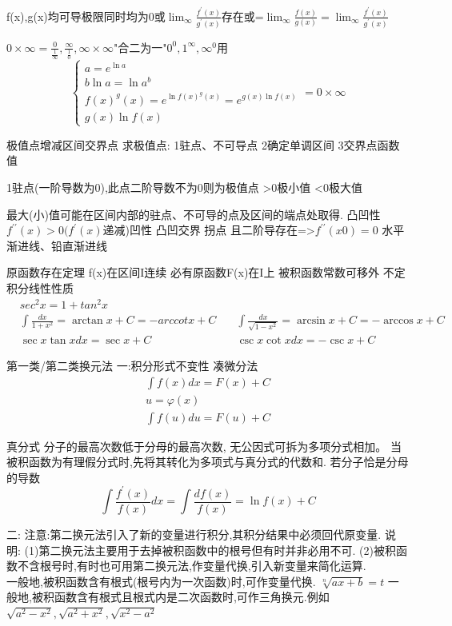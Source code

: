 \documentclass[10pt, a4paper, oneside]{ctexart}
\begin{document}
\begin{sloppypar}
	f(x),g(x)均可导极限同时均为0或$\lim_{\infty}\frac{f^{\prime}(x)}{g^{\prime}(x)}$存在或=$\lim_{\infty}\frac{f(x)}{g(x)} = \lim_{\infty}\frac{f^{\prime}(x)}{g^{\prime}(x)}$\par
	$0 \times \infty = \frac{0}{ \frac{1}{\infty}} , \frac{\infty}{\frac{1}{0}},
		\infty \times \infty $"合二为一"$0^0,1^\infty,\infty^0$用
	$$
		\begin{cases}
			a=e^{\ln a}                                        \\
			b\ln a = \ln{a^b}                                  \\
			f(x)^g(x) = e^{\ln{f(x)^g(x)}} = e^{g(x)\ln{f(x)}} \\
			g(x)\ln{f(x)}
		\end{cases}=0\times\infty
	$$

	极值点增减区间交界点
	求极值点:
	1驻点、不可导点
	2确定单调区间
	3交界点函数值

	1驻点(一阶导数为0),此点二阶导数不为0则为极值点 >0极小值 <0极大值

	最大(小)值可能在区间内部的驻点、不可导的点及区间的端点处取得.
	凸凹性$f^{\prime\prime}(x)>0(f^{\prime}(x)$递减)凹性 凸凹交界 拐点 且二阶导存在=>$f^{\prime\prime}(x0) = 0$
	水平渐进线、铅直渐进线

	原函数存在定理 f(x)在区间I连续 必有原函数F(x)在I上
	被积函数常数可移外
	不定积分线性性质
	\begin{align*}
		 & sec^2 x = 1 + tan^2 x                                  &                                                            \\
		 & \int\frac{dx}{1+x^2}=\arctan x + C=-arccot x + C \quad & \int\frac{dx}{\sqrt{1-x^2}}=\arcsin x + C = -\arccos x + C \\
		 & \sec x\tan xdx=\sec x + C\quad                         & \csc x\cot xdx=-\csc x + C
	\end{align*}

	第一类/第二类换元法
	一:积分形式不变性  凑微分法
	\begin{gather*}
		\int f(x)dx=F(x)+C\\
		u=\varphi(x)\\
		\int f(u)du=F(u)+C
	\end{gather*}

	真分式 分子的最高次数低于分母的最高次数, 无公因式可拆为多项分式相加。
	当被积函数为有理假分式时,先将其转化为多项式与真分式的代数和.
	若分子恰是分母的导数
	$$\int \frac{f^{\prime}(x)}{f(x)}dx=\int\frac{df(x)}{f(x)}=\ln f(x)+C$$

	二:
	注意:第二换元法引入了新的变量进行积分,其积分结果中必须回代原变量.
	说明:
	(1)第二换元法主要用于去掉被积函数中的根号但有时并非必用不可.
	(2)被积函数不含根号时,有时也可用第二换元法,作变量代换,引入新变量来简化运算.\\
	一般地,被积函数含有根式(根号内为一次函数)时,可作变量代换.
	$\sqrt[n]{ax+b}=t$
	一般地,被积函数含有根式且根式内是二次函数时,可作三角换元.例如$\sqrt{a^2 - x^2},\sqrt{a^2 + x^2},\sqrt{x^2 - a^2}$


\end{sloppypar}
\end{document}
